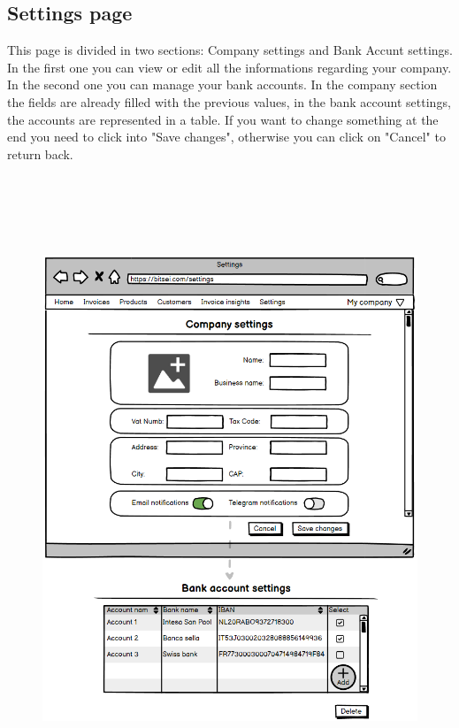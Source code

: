 \subsection{Settings page}
This page is divided in two sections: Company settings and Bank Accunt settings. In the first one you can view or edit all the informations regarding your company. In the second one you can manage your bank accounts.
In the company section the fields are already filled with the previous values, in the bank account settings, the accounts are represented in a table.
If you want to change something at the end you need to click into "Save changes", otherwise you can click on "Cancel" to return back.
\begin{figure}[h!]
    \centering
    \includegraphics[height=530pt, keepaspectratio]{resources/mockup/Settings.png}
\end{figure}